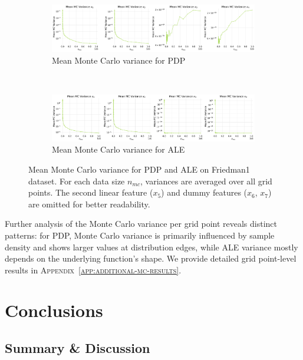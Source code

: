 \documentclass[runningheads]{llncs}
\begin{document}
\begin{figure}[h!]
    \centering
    \begin{subfigure}[b]{\textwidth}
        \centering
        \includegraphics[width=\textwidth]{img/mean_mc_variance_friedman1_pdp.png}
        \caption{Mean Monte Carlo variance for PDP}
        \label{fig:mc-variance-pdp}  %
    \end{subfigure}
    \\[10pt]
    \vfill
    \begin{subfigure}[b]{\textwidth}
        \centering
        \includegraphics[width=\textwidth]{img/mean_mc_variance_friedman1_ale.png}
        \caption{Mean Monte Carlo variance for ALE}
        \label{fig:mc-variance-ale}  %
    \end{subfigure}
    \caption{Mean Monte Carlo variance for PDP and ALE on Friedman1 dataset.
        For each data size $n_{mc}$, variances are averaged over all grid points.
        The second linear feature ($x_5$) and dummy features ($x_6$, $x_7$) are omitted for better readability.}
    \label{fig:mc-variance}  %
\end{figure}

\noindent Further analysis of the Monte Carlo variance per grid point
reveals distinct patterns: for PDP, Monte Carlo variance is
primarily influenced by sample density and shows larger values
at distribution edges, while ALE variance mostly depends on 
the underlying function's shape. We provide detailed grid point-level
results in \textsc{Appendix~\ref{app:additional-mc-results}}.


\section{Conclusions}\label{sec:conclusion}

\subsection{Summary \& Discussion}
\end{document}
